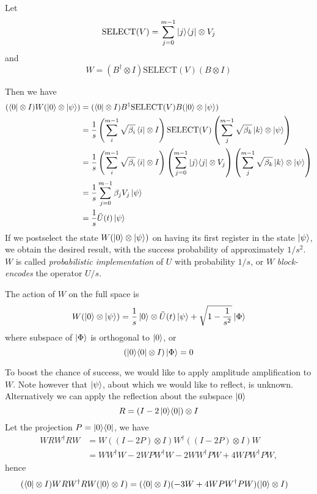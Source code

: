 \documentclass[11pt, oneside]{article}   	%
\begin{document}
Let 
\begin{equation*} 
\textrm{SELECT}(V) = \sum^{m-1}_{j = 0} \ket{j} \! \bra{j} \otimes V_j
\end{equation*}
and 
\begin{equation*} 
W = (B^{\dagger} \otimes I) \textrm{SELECT}(V) (B \otimes I)
\end{equation*}

Then we have 
\begin{align*} 
(\bra{0} \otimes I) W (\ket{0} \otimes \ket{\psi}) 
&= (\bra{0} \otimes I) B^{\dagger} \textrm{SELECT}(V) B (\ket{0} \otimes \ket{\psi}) \\
&= \frac{1}{s} \left( \sum^{m-1}_i \sqrt{\beta_i} \bra{i} \otimes I \right) \textrm{SELECT}(V) \left( \sum^{m-1}_j \sqrt{\beta_k} \ket{k} \otimes \ket{\psi} \right) \\
&= \frac{1}{s} \left( \sum^{m-1}_i \sqrt{\beta_i} \bra{i} \otimes I \right) \left( \sum^{m-1}_{j = 0} \ket{j} \! \bra{j} \otimes V_j \right) \left( \sum^{m-1}_j \sqrt{\beta_k} \ket{k} \otimes \ket{\psi} \right) \\
&= \frac{1}{s} \sum^{m-1}_{j = 0} \beta_j V_j \ket{\psi} \\
&= \frac{1}{s} \tilde{U}(t) \ket{\psi}
\end{align*}
If we postselect the state $W (\ket{0} \otimes \ket{\psi})$ on having its first register in the state $\ket{\psi}$, we obtain the desired result, with the success probability of approximately $1/s^2$.
$W$ is called \textit{probabilistic implementation} of $U$ with probability $1/s$, or $W$ \textit{block-encodes} the operator $U/s$.

The action of $W$ on the full space is
\begin{equation*} 
W (\ket{0} \otimes \ket{\psi}) = \frac{1}{s} \ket{0} \otimes \tilde{U}(t) \ket{\psi} + \sqrt{1 - \frac{1}{s^2}} \ket{\Phi}
\end{equation*}
where subspace of $\ket{\Phi}$ is orthogonal to $\ket{0}$, or
\begin{equation*}
(\ket{0} \! \bra{0} \otimes I) \ket{\Phi} = 0
\end{equation*}

To boost the chance of success, we would like to apply amplitude amplification to $W$. Note however that $\ket{\psi}$, about which we would like to reflect, is unknown.
Alternatively we can apply the reflection about the subspace $\ket{0}$
\begin{equation*} 
R = (I - 2 \ket{0} \! \bra{0}) \otimes I
\end{equation*}
Let the projection $P = \ket{0} \! \bra{0}$, we have
\begin{align*} 
W R W^{\dagger} R W 
&= W ((I - 2 P) \otimes I) W^{\dagger} ((I - 2 P) \otimes I) W \\
&= W W^{\dagger} W - 2 W P W^{\dagger} W - 2 W W^{\dagger} P W + 4 W P W^{\dagger} P W,
\end{align*}
hence 
\begin{align*} 
(\bra{0} \otimes I) W R W^{\dagger} R W (\ket{0} \otimes I) 
&= (\bra{0} \otimes I) (-3W + 4 W P W^{\dagger} P W) (\ket{0} \otimes I) 
\end{align*}
\end{document}
